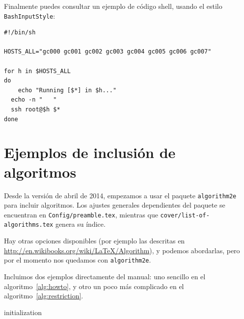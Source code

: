 \begin{codefloat}

\caption{Ejemplo con colores usando el estilo \texttt{Ccolor}}
\label{cod:sample5}
\end{codefloat}

Finalmente puedes consultar un ejemplo de código shell, usando el estilo
\texttt{BashInputStyle}:

\begin{lstlisting}[style=BashInputStyle, numbers=none]
#!/bin/sh

HOSTS_ALL="gc000 gc001 gc002 gc003 gc004 gc005 gc006 gc007"

for h in $HOSTS_ALL
do
	echo "Running [$*] in $h..."
  echo -n "   "
  ssh root@$h $*
done
\end{lstlisting}


\section{Ejemplos de inclusión de algoritmos}
\label{sec:algoritmos}

Desde la versión de abril de 2014, empezamos a usar el paquete \texttt{algorithm2e} para incluir algoritmos. Los ajustes generales dependientes del paquete se encuentran en \texttt{Config/preamble.tex}, mientras que \texttt{cover/list-of-algorithms.tex} genera su índice.

Hay otras opciones disponibles (por ejemplo las descritas en
\url{http://en.wikibooks.org/wiki/LaTeX/Algorithm}), y podemos
abordarlas, pero por el momento nos quedamos con \texttt{algorithm2e}.

Incluimos dos ejemplos directamente del manual: uno sencillo en el
algoritmo~\ref{alg:howto}, y otro un poco más complicado en el
algoritmo~\ref{alg:restriction}.

\begin{algorithm}[H]
 \caption{How to write algorithms}
 \label{alg:howto}
 initialization\;
\end{algorithm}


